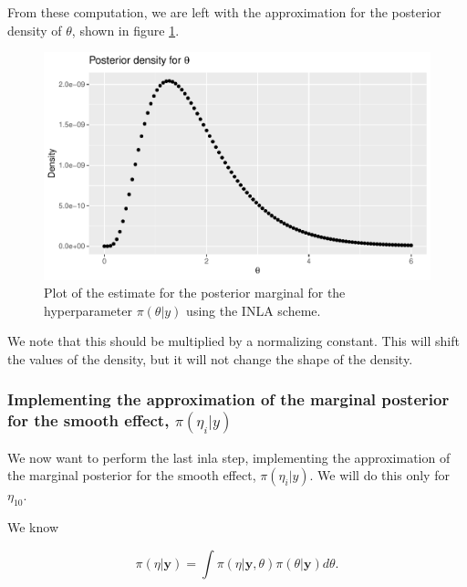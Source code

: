 



From these computation, we are left with the approximation for the posterior density of $\theta$, shown in figure \ref{fig:post_theta_inla}. 
\begin{figure}[H]
    \centering
    \includegraphics[width=\textwidth]{Images/post_theta_inla.pdf}
    \caption{Plot of the estimate for the posterior marginal for the hyperparameter $\pi(\theta|y)$ using the INLA scheme.}
    \label{fig:post_theta_inla}
\end{figure}

We note that this should be multiplied by a normalizing constant. This will shift the values of the density, but it will not change the shape of the density. 

\subsubsection{Implementing the approximation of the marginal posterior for the smooth effect, $\pi(\eta_i | y)$}

We now want to perform the last inla step, implementing the approximation of the marginal posterior for the smooth effect, $\pi(\eta_i | y)$. We will do this only for $\eta_{10}$. 

We know 

\begin{equation}
\label{eq:eta_post}
    \pi(\eta|\boldsymbol{y}) = \int \pi(\eta|\boldsymbol{y}, \theta) \pi(\theta|\boldsymbol{y}) d\theta.
\end{equation}

